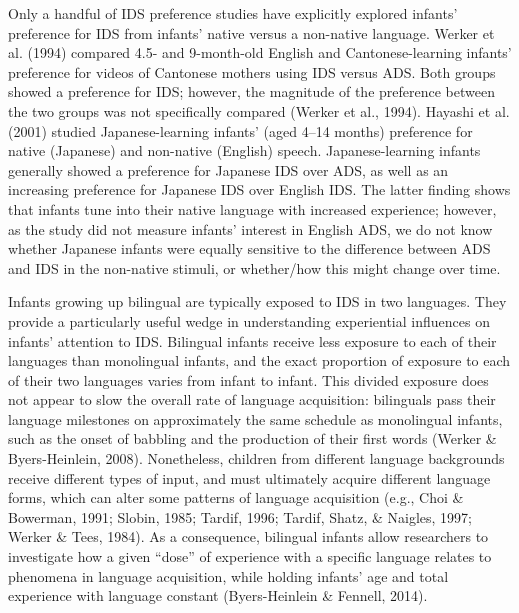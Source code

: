 \documentclass[english,,man,floatsintext]{apa6}
\begin{document}
Only a handful of IDS preference studies have explicitly explored infants' preference for IDS from infants' native versus a non-native language. Werker et al. (1994) compared 4.5- and 9-month-old English and Cantonese-learning infants' preference for videos of Cantonese mothers using IDS versus ADS. Both groups showed a preference for IDS; however, the magnitude of the preference between the two groups was not specifically compared (Werker et al., 1994). Hayashi et al. (2001) studied Japanese-learning infants' (aged 4--14 months) preference for native (Japanese) and non-native (English) speech. Japanese-learning infants generally showed a preference for Japanese IDS over ADS, as well as an increasing preference for Japanese IDS over English IDS. The latter finding shows that infants tune into their native language with increased experience; however, as the study did not measure infants' interest in English ADS, we do not know whether Japanese infants were equally sensitive to the difference between ADS and IDS in the non-native stimuli, or whether/how this might change over time.

Infants growing up bilingual are typically exposed to IDS in two languages. They provide a particularly useful wedge in understanding experiential influences on infants' attention to IDS. Bilingual infants receive less exposure to each of their languages than monolingual infants, and the exact proportion of exposure to each of their two languages varies from infant to infant. This divided exposure does not appear to slow the overall rate of language acquisition: bilinguals pass their language milestones on approximately the same schedule as monolingual infants, such as the onset of babbling and the production of their first words (Werker \& Byers-Heinlein, 2008). Nonetheless, children from different language backgrounds receive different types of input, and must ultimately acquire different language forms, which can alter some patterns of language acquisition (e.g., Choi \& Bowerman, 1991; Slobin, 1985; Tardif, 1996; Tardif, Shatz, \& Naigles, 1997; Werker \& Tees, 1984). As a consequence, bilingual infants allow researchers to investigate how a given \enquote{dose} of experience with a specific language relates to phenomena in language acquisition, while holding infants' age and total experience with language constant (Byers-Heinlein \& Fennell, 2014).
\end{document}
